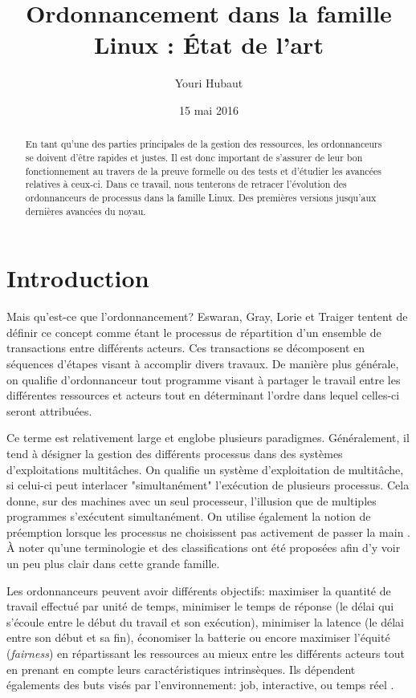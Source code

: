 \documentclass[letterpaper]{article}
\title{Ordonnancement dans la famille Linux : État de l'art}
\date{15 mai 2016}
\author{Youri Hubaut}
\begin{document}
\maketitle

\begin{abstract}

En tant qu'une des parties principales de la gestion des ressources, les ordonnanceurs se doivent d'être rapides et justes. Il est donc important de s'assurer de leur bon fonctionnement au travers de la preuve formelle ou des tests et d'étudier les avancées relatives à ceux-ci. Dans ce travail, nous tenterons de retracer l'évolution des ordonnanceurs de processus dans la famille Linux. Des premières versions jusqu'aux dernières avancées du noyau.

\end{abstract}

\section{Introduction}

Mais qu'est-ce que l'ordonnancement? Eswaran, Gray, Lorie et Traiger \citep{Eswaran:1976:NPC:360363.360369} tentent de définir ce concept comme étant le processus de répartition d'un ensemble de transactions entre différents acteurs. Ces transactions se décomposent en séquences d'étapes visant à accomplir divers travaux. De manière plus générale, on qualifie d'ordonnanceur tout programme visant à partager le travail entre les différentes ressources et acteurs tout en déterminant l'ordre dans lequel celles-ci seront attribuées.

Ce terme est relativement large et englobe plusieurs paradigmes. Généralement, il tend à désigner la gestion des différents processus dans des systèmes d'exploitations multitâches. On qualifie un système d'exploitation de multitâche, si celui-ci peut interlacer "simultanément" l'exécution de plusieurs processus. Cela donne, sur des machines avec un seul processeur, l'illusion que de multiples programmes s'exécutent simultanément. On utilise également la notion de préemption lorsque les processus ne choisissent pas activement de passer la main \citep{Bach:1986:DUO:8570}. À noter qu'une terminologie \citep{Casavant:1988:TSG:630789.630963} et des classifications \citep{DBLP:journals/tc/WangM85} ont été proposées afin d'y voir un peu plus clair dans cette grande famille.

Les ordonnanceurs peuvent avoir différents objectifs: maximiser la quantité de travail effectué par unité de temps, minimiser le temps de réponse (le délai qui s'écoule entre le début du travail et son exécution), minimiser la latence (le délai entre son début et sa fin), économiser la batterie ou encore maximiser l'équité (\textit{fairness}) en répartissant les ressources au mieux entre les différents acteurs tout en prenant en compte leurs caractéristiques intrinsèques.
Ils dépendent égalements des buts visés par l'environnement: job, interactive, ou temps réel \citep{Hansen:1973:OSP:540365}.
\end{document}
